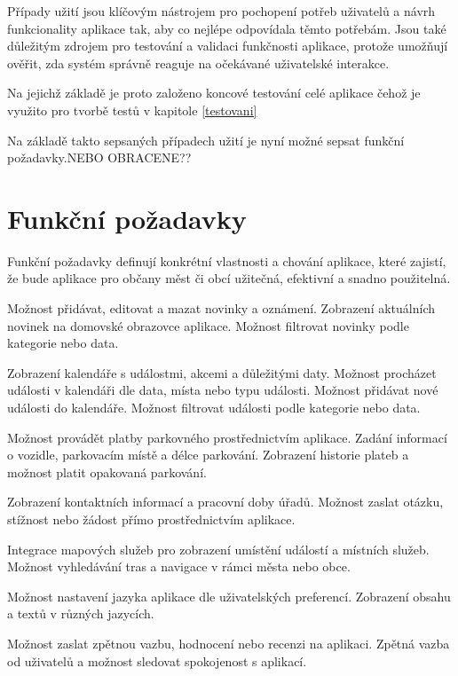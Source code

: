 Případy užití jsou klíčovým nástrojem pro pochopení potřeb uživatelů a návrh funkcionality aplikace tak, aby co nejlépe odpovídala těmto potřebám. 
Jsou také důležitým zdrojem pro testování a validaci funkčnosti aplikace, protože umožňují ověřit, zda systém správně reaguje na očekávané 
uživatelské interakce. 

Na jejichž základě je proto založeno koncové testování celé aplikace  čehož je využito pro tvorbě testů v kapitole \ref{testovani}

Na základě takto sepsaných případech užití je nyní možné sepsat funkční požadavky.NEBO OBRACENE??

\section{Funkční požadavky}
Funkční požadavky definují konkrétní vlastnosti a chování aplikace, které zajistí, že bude aplikace pro občany měst či obcí 
užitečná, efektivní a snadno použitelná.

Možnost přidávat, editovat a mazat novinky a oznámení.
Zobrazení aktuálních novinek na domovské obrazovce aplikace.
Možnost filtrovat novinky podle kategorie nebo data.

Zobrazení kalendáře s událostmi, akcemi a důležitými daty.
Možnost procházet události v kalendáři dle data, místa nebo typu události.
Možnost přidávat nové události do kalendáře.
Možnost filtrovat události podle kategorie nebo data.

Možnost provádět platby parkovného prostřednictvím aplikace.
Zadání informací o vozidle, parkovacím místě a délce parkování.
Zobrazení historie plateb a možnost platit opakovaná parkování.

Zobrazení kontaktních informací a pracovní doby úřadů.
Možnost zaslat otázku, stížnost nebo žádost přímo prostřednictvím aplikace.

Integrace mapových služeb pro zobrazení umístění událostí a místních služeb.
Možnost vyhledávání tras a navigace v rámci města nebo obce.

Možnost nastavení jazyka aplikace dle uživatelských preferencí.
Zobrazení obsahu a textů v různých jazycích.

Možnost zaslat zpětnou vazbu, hodnocení nebo recenzi na aplikaci.
Zpětná vazba od uživatelů a možnost sledovat spokojenost s aplikací.

